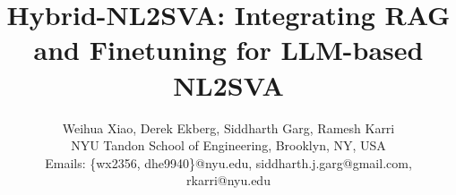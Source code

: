 \documentclass[conference,9pt]{IEEEtran}
\begin{document}
\title{
Hybrid-NL2SVA: Integrating RAG and Finetuning for LLM-based NL2SVA
}

\author{%
{\normalsize Weihua Xiao, Derek Ekberg, Siddharth Garg, Ramesh Karri}\\
{\normalsize NYU Tandon School of Engineering, Brooklyn, NY, USA}\\
{\normalsize Emails: \{wx2356, dhe9940\}@nyu.edu, siddharth.j.garg@gmail.com, rkarri@nyu.edu}
}

\IEEEoverridecommandlockouts
{}
\end{document}
